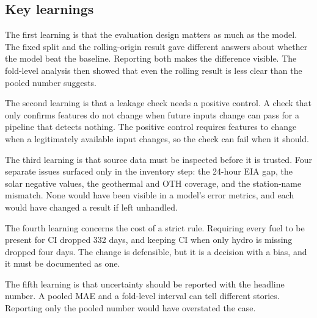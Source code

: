\documentclass[10pt,journal,compsoc]{IEEEtran}
\begin{document}
\subsection{Key learnings}
The first learning is that the evaluation design matters as much as the model. The fixed split and the rolling-origin result gave different answers about whether the model beat the baseline. Reporting both makes the difference visible. The fold-level analysis then showed that even the rolling result is less clear than the pooled number suggests.

The second learning is that a leakage check needs a positive control. A check that only confirms features do not change when future inputs change can pass for a pipeline that detects nothing. The positive control requires features to change when a legitimately available input changes, so the check can fail when it should.

The third learning is that source data must be inspected before it is trusted. Four separate issues surfaced only in the inventory step: the 24-hour EIA gap, the solar negative values, the geothermal and OTH coverage, and the station-name mismatch. None would have been visible in a model's error metrics, and each would have changed a result if left unhandled.

The fourth learning concerns the cost of a strict rule. Requiring every fuel to be present for CI dropped 332 days, and keeping CI when only hydro is missing dropped four days. The change is defensible, but it is a decision with a bias, and it must be documented as one.

The fifth learning is that uncertainty should be reported with the headline number. A pooled MAE and a fold-level interval can tell different stories. Reporting only the pooled number would have overstated the case.
\end{document}
